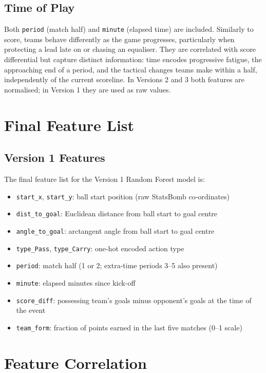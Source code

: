 \subsection{Time of Play}

Both \texttt{period} (match half) and \texttt{minute} (elapsed time) are included. Similarly to score, teams behave differently as the game progresses, particularly when protecting a lead late on or chasing an equaliser. They are correlated with score differential but capture distinct information: time encodes progressive fatigue, the approaching end of a period, and the tactical changes teams make within a half, independently of the current scoreline. In Versions 2 and 3 both features are normalised; in Version 1 they are used as raw values.

\section{Final Feature List}

\subsection{Version 1 Features}\label{sec:v1_features}

The final feature list for the Version 1 Random Forest model is:

\begin{itemize}
    \item \texttt{start\_x}, \texttt{start\_y}: ball start position (raw StatsBomb co-ordinates)
    \item \texttt{dist\_to\_goal}: Euclidean distance from ball start to goal centre
    \item \texttt{angle\_to\_goal}: arctangent angle from ball start to goal centre
    \item \texttt{type\_Pass}, \texttt{type\_Carry}: one-hot encoded action type
    \item \texttt{period}: match half (1 or 2; extra-time periods 3--5 also present)
    \item \texttt{minute}: elapsed minutes since kick-off
    \item \texttt{score\_diff}: possessing team's goals minus opponent's goals at the time of the event
    \item \texttt{team\_form}: fraction of points earned in the last five matches (0--1 scale)
\end{itemize}

\section{Feature Correlation}

